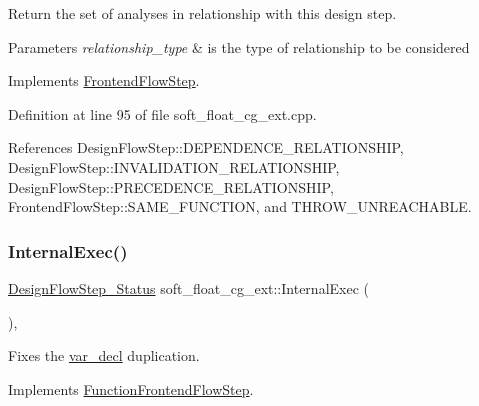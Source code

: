 Return the set of analyses in relationship with this design step. 


\begin{DoxyParams}{Parameters}
{\em relationship\+\_\+type} & is the type of relationship to be considered \\
\hline
\end{DoxyParams}


Implements \hyperlink{classFrontendFlowStep_abeaff70b59734e462d347ed343dd700d}{Frontend\+Flow\+Step}.



Definition at line 95 of file soft\+\_\+float\+\_\+cg\+\_\+ext.\+cpp.



References Design\+Flow\+Step\+::\+D\+E\+P\+E\+N\+D\+E\+N\+C\+E\+\_\+\+R\+E\+L\+A\+T\+I\+O\+N\+S\+H\+IP, Design\+Flow\+Step\+::\+I\+N\+V\+A\+L\+I\+D\+A\+T\+I\+O\+N\+\_\+\+R\+E\+L\+A\+T\+I\+O\+N\+S\+H\+IP, Design\+Flow\+Step\+::\+P\+R\+E\+C\+E\+D\+E\+N\+C\+E\+\_\+\+R\+E\+L\+A\+T\+I\+O\+N\+S\+H\+IP, Frontend\+Flow\+Step\+::\+S\+A\+M\+E\+\_\+\+F\+U\+N\+C\+T\+I\+ON, and T\+H\+R\+O\+W\+\_\+\+U\+N\+R\+E\+A\+C\+H\+A\+B\+LE.

\mbox{\label{classsoft__float__cg__ext_a74ee320b5843e7266c0111511b6aeedc}} 
\subsubsection{\texorpdfstring{Internal\+Exec()}{InternalExec()}}
{\footnotesize\ttfamily \hyperlink{design__flow__step_8hpp_afb1f0d73069c26076b8d31dbc8ebecdf}{Design\+Flow\+Step\+\_\+\+Status} soft\+\_\+float\+\_\+cg\+\_\+ext\+::\+Internal\+Exec (\begin{DoxyParamCaption}{ }\end{DoxyParamCaption})\hspace{0.3cm}{\ttfamily [override]}, {\ttfamily [virtual]}}



Fixes the \hyperlink{structvar__decl}{var\+\_\+decl} duplication. 



Implements \hyperlink{classFunctionFrontendFlowStep_a00612f7fb9eabbbc8ee7e39d34e5ac68}{Function\+Frontend\+Flow\+Step}.



